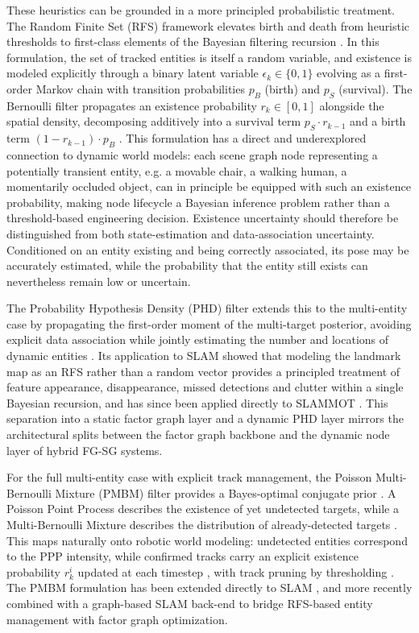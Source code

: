 These heuristics can be grounded in a more principled probabilistic treatment.
The Random Finite Set (RFS) framework elevates birth and death from heuristic thresholds to first-class elements of the Bayesian filtering recursion \cite{ristic2013tutorial}. 
In this formulation, the set of tracked entities is itself a random variable, and existence is modeled explicitly through a binary latent variable $\epsilon_k \in \{0,1\}$ evolving as a first-order Markov chain with transition probabilities $p_B$ (birth) and $p_S$ (survival). 
The Bernoulli filter propagates an existence probability $r_k \in [0,1]$ alongside the spatial density, decomposing additively into a survival term $p_S \cdot r_{k-1}$ and a birth term $(1-r_{k-1})\cdot p_B$ \cite{ristic2013tutorial}. 
This formulation has a direct and underexplored connection to dynamic world models: each scene graph node representing a potentially transient entity, e.g. a movable chair, a walking human, a momentarily occluded object, can in principle be equipped with such an existence probability, making node lifecycle a Bayesian inference problem rather than a threshold-based engineering decision.
Existence uncertainty should therefore be distinguished from both state-estimation and data-association uncertainty. Conditioned on an entity existing and being correctly associated, its pose may be accurately estimated, while the probability that the entity still exists can nevertheless remain low or uncertain.

The Probability Hypothesis Density (PHD) filter extends this to the multi-entity case by propagating the first-order moment of the multi-target posterior, avoiding explicit data association while jointly estimating the number and locations of dynamic entities \cite{mullane2011random}. 
Its application to SLAM \cite{mullane2011random} showed that modeling the landmark map as an RFS rather than a random vector provides a principled treatment of feature appearance, disappearance, missed detections and clutter within a single Bayesian recursion, and has since been applied directly to SLAMMOT \cite{siew2018simultaneous}. 
This separation into a static factor graph layer and a dynamic PHD layer mirrors the architectural splits between the factor graph backbone and the dynamic node layer of hybrid FG-SG systems.

For the full multi-entity case with explicit track management, the Poisson Multi-Bernoulli Mixture (PMBM) filter provides a Bayes-optimal conjugate prior \cite{garcia2018poisson}. 
A Poisson Point Process describes the existence of yet undetected targets, while a Multi-Bernoulli Mixture describes the distribution of already-detected targets \cite{granstrom2019poisson}. 
This maps naturally onto robotic world modeling: undetected entities correspond to the PPP intensity, while confirmed tracks carry an explicit existence probability $r_k^i$ updated at each timestep \cite{deusch2015labeled}, with track pruning by thresholding \cite{reuter2014labeled}. 
The PMBM formulation has been extended directly to SLAM \cite{kim2022pmbm}, and more recently combined with a graph-based SLAM back-end \cite{ge2025batch} to bridge RFS-based entity management with factor graph optimization.

